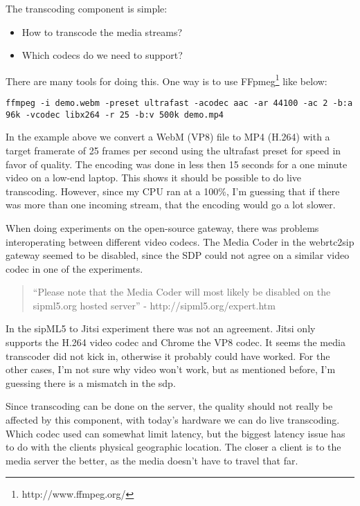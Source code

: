 The transcoding component is simple:

\begin{itemize}
\item{How to transcode the media streams?}
\item{Which codecs do we need to support?}
\end{itemize}

There are many tools for doing this. One way is to use FFpmeg\footnote{http://www.ffmpeg.org/} like below:

\begin{lstlisting}
ffmpeg -i demo.webm -preset ultrafast -acodec aac -ar 44100 -ac 2 -b:a 96k -vcodec libx264 -r 25 -b:v 500k demo.mp4
\end{lstlisting}

In the example above we convert a WebM (VP8) file to MP4 (H.264) with a target framerate of 25 frames per second using the ultrafast preset for speed in favor of quality. The encoding was done in less then 15 seconds for a one minute video on a low-end laptop. This shows it should be possible to do live transcoding. However, since my CPU ran at a 100\%, I'm guessing that if there was more than one incoming stream, that the encoding would go a lot slower.

When doing experiments on the open-source gateway, there was problems interoperating between different video codecs. The Media Coder in the webrtc2sip gateway seemed to be disabled, since the SDP could not agree on a similar video codec in one of the experiments.

\begin{quote}
``Please note that the Media Coder will most likely be disabled on the sipml5.org hosted server'' - http://sipml5.org/expert.htm
\end{quote}

In the sipML5 to Jitsi experiment there was not an agreement. Jitsi only supports the H.264 video codec and Chrome the VP8 codec. It seems the media transcoder did not kick in, otherwise it probably could have worked. For the other cases, I'm not sure why video won't work, but as mentioned before, I'm guessing there is a mismatch in the \gls{sdp}.

Since transcoding can be done on the server, the quality should not really be affected by this component, with today's hardware we can do live transcoding. Which codec used can somewhat limit latency, but the biggest latency issue has to do with the clients physical geographic location. The closer a client is to the media server the better, as the media doesn't have to travel that far.


